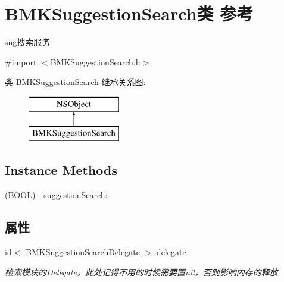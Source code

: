 \hypertarget{interface_b_m_k_suggestion_search}{}\section{B\+M\+K\+Suggestion\+Search类 参考}
\label{interface_b_m_k_suggestion_search}


sug搜索服务  




{\ttfamily \#import $<$B\+M\+K\+Suggestion\+Search.\+h$>$}

类 B\+M\+K\+Suggestion\+Search 继承关系图\+:\begin{figure}[H]
\begin{center}
\leavevmode
\includegraphics[height=2.000000cm]{interface_b_m_k_suggestion_search}
\end{center}
\end{figure}
\subsection*{Instance Methods}
\begin{DoxyCompactItemize}
\item 
(B\+O\+O\+L) -\/ \hyperlink{interface_b_m_k_suggestion_search_a86144cad8ce80290cb6c352f5b68cbdc}{suggestion\+Search\+:}
\end{DoxyCompactItemize}
\subsection*{属性}
\begin{DoxyCompactItemize}
\item 
\hypertarget{interface_b_m_k_suggestion_search_a37cc038d39539458fe7071154b2ddaaa}{}id$<$ \hyperlink{protocol_b_m_k_suggestion_search_delegate-p}{B\+M\+K\+Suggestion\+Search\+Delegate} $>$ \hyperlink{interface_b_m_k_suggestion_search_a37cc038d39539458fe7071154b2ddaaa}{delegate}\label{interface_b_m_k_suggestion_search_a37cc038d39539458fe7071154b2ddaaa}

\begin{DoxyCompactList}\small\item\em 检索模块的\+Delegate，此处记得不用的时候需要置nil，否则影响内存的释放 \end{DoxyCompactList}\end{DoxyCompactItemize}



